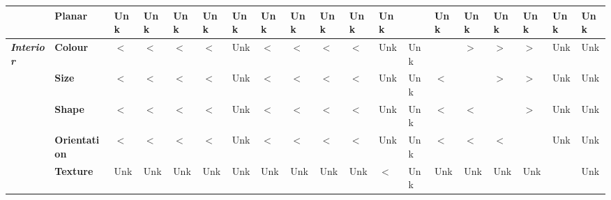 \begin{table*}[t!]
\begin{center}
{\begin{tabular}{|l|l|l|l|l|l|l|l|l|l|l|l|l|l|l|l|l|l|l|}
\multicolumn{ 1}{|l|}{} & \textbf{Planar} & Unk\cellcolor{Cream} & Unk\cellcolor{Cream} & Unk\cellcolor{Cream} & Unk\cellcolor{Cream} & Unk\cellcolor{Cream} & Unk\cellcolor{Cream} & Unk\cellcolor{Cream} & Unk\cellcolor{Cream} & Unk\cellcolor{Cream} & Unk\cellcolor{Cream} & \cellcolor{Gray} & Unk\cellcolor{Cream} & Unk\cellcolor{Cream} & Unk\cellcolor{Cream} & Unk\cellcolor{Cream} & Unk\cellcolor{Cream} & Unk\cellcolor{Cream} \\ \hline
\multicolumn{ 1}{|l|}{\textbf{\textit{Interior}}} & \textbf{Colour} & $\lt$\cellcolor{Blue} & $\lt$\cellcolor{Blue} & $\lt$\cellcolor{Blue} & $\lt$\cellcolor{Blue} & Unk\cellcolor{Cream} & $\lt$\cellcolor{Blue} & $\lt$\cellcolor{Blue} & $\lt$\cellcolor{Blue} & $\lt$\cellcolor{Blue} & Unk\cellcolor{Cream} & Unk\cellcolor{Cream} & \cellcolor{Gray} & $\gt$\cellcolor{Orange} & $\gt$\cellcolor{Orange} & $\gt$\cellcolor{Orange} & Unk\cellcolor{Cream} & Unk\cellcolor{Cream} \\ \cline{ 2- 19}
\multicolumn{ 1}{|l|}{} & \textbf{Size} & $\lt$\cellcolor{Blue} & $\lt$\cellcolor{Blue} & $\lt$\cellcolor{Blue} & $\lt$\cellcolor{Blue} & Unk\cellcolor{Cream} & $\lt$\cellcolor{Blue} & $\lt$\cellcolor{Blue} & $\lt$\cellcolor{Blue} & $\lt$\cellcolor{Blue} & Unk\cellcolor{Cream} & Unk\cellcolor{Cream} & $\lt$\cellcolor{Blue} & \cellcolor{Gray} & $\gt$\cellcolor{Orange} & $\gt$\cellcolor{Orange} & Unk\cellcolor{Cream} & Unk\cellcolor{Cream} \\ \cline{ 2- 19}
\multicolumn{ 1}{|l|}{} & \textbf{Shape} & $\lt$\cellcolor{Blue} & $\lt$\cellcolor{Blue} & $\lt$\cellcolor{Blue} & $\lt$\cellcolor{Blue} & Unk\cellcolor{Cream} & $\lt$\cellcolor{Blue} & $\lt$\cellcolor{Blue} & $\lt$\cellcolor{Blue} & $\lt$\cellcolor{Blue} & Unk\cellcolor{Cream} & Unk\cellcolor{Cream} & $\lt$\cellcolor{Blue} & $\lt$\cellcolor{Blue} & \cellcolor{Gray} & $\gt$\cellcolor{Orange} & Unk\cellcolor{Cream} & Unk\cellcolor{Cream} \\ \cline{ 2- 19}
\multicolumn{ 1}{|l|}{} & \textbf{Orientation} & $\lt$\cellcolor{Blue} & $\lt$\cellcolor{Blue} & $\lt$\cellcolor{Blue} & $\lt$\cellcolor{Blue} & Unk\cellcolor{Cream} & $\lt$\cellcolor{Blue} & $\lt$\cellcolor{Blue} & $\lt$\cellcolor{Blue} & $\lt$\cellcolor{Blue} & Unk\cellcolor{Cream} & Unk\cellcolor{Cream} & $\lt$\cellcolor{Blue} & $\lt$\cellcolor{Blue} & $\lt$\cellcolor{Blue} & \cellcolor{Gray} & Unk\cellcolor{Cream} & Unk\cellcolor{Cream} \\ \cline{ 2- 19}
\multicolumn{ 1}{|l|}{} & \textbf{Texture} & Unk\cellcolor{Cream} & Unk\cellcolor{Cream} & Unk\cellcolor{Cream} & Unk\cellcolor{Cream} & Unk\cellcolor{Cream} & Unk\cellcolor{Cream} & Unk\cellcolor{Cream} & Unk\cellcolor{Cream} & Unk\cellcolor{Cream} & $\lt$\cellcolor{Blue} & Unk\cellcolor{Cream} & Unk\cellcolor{Cream} & Unk\cellcolor{Cream} & Unk\cellcolor{Cream} & Unk\cellcolor{Cream} & \cellcolor{Gray} & Unk\cellcolor{Cream} \\ \cline{ 2- 19}

\end{tabular}}
\end{center}
\end{table*}
